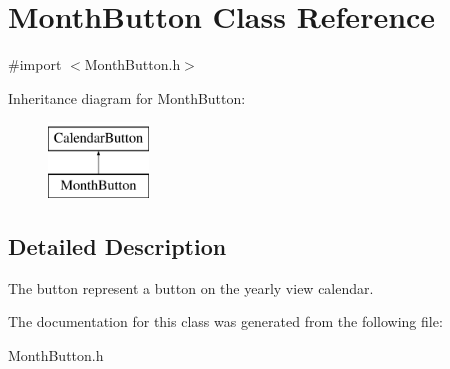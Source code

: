 \hypertarget{interface_month_button}{\section{\-Month\-Button \-Class \-Reference}
\label{interface_month_button}
}


{\ttfamily \#import $<$\-Month\-Button.\-h$>$}

\-Inheritance diagram for \-Month\-Button\-:\begin{figure}[H]
\begin{center}
\leavevmode
\includegraphics[height=2.000000cm]{interface_month_button}
\end{center}
\end{figure}


\subsection{\-Detailed \-Description}
\-The button represent a button on the yearly view calendar. 

\-The documentation for this class was generated from the following file\-:\begin{DoxyCompactItemize}
\item 
\-Month\-Button.\-h\end{DoxyCompactItemize}
